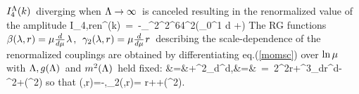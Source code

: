 \s$I_4^\Lambda(k)\hspace{0.05cm}$ diverging when \s$\Lambda\to\infty\hspace{0.05cm}$
is canceled resulting in the renormalized
value of the amplitude
\qq
\hat I_{4,ren}^\La(k)\ =\
-{_{\mu^2\m\la^2}\over^{64\pi^2}}\left(\int_0^1 d\alpha
\s\s{}
\s+\right)
\non
\qqq
The RG functions \s$\beta(\lambda,r)=\mu{d\over d\mu}\hspace{0.025cm}\lambda\hspace{0.05cm},
\ \hspace{0.05cm}\gamma_2(\lambda,r)=\mu{d\over d\mu}\hspace{0.025cm} r\hspace{0.05cm}$ describing the
scale-dependence of the renormalized couplings are obtained
by differentiating eq.\s\s(\ref{momsc}) over \s$\ln{\mu}\hspace{0.05cm}$
with \s$\Lambda,g(\Lambda)\hspace{0.05cm}$ and \s$m^2(\Lambda)\hspace{0.05cm}$ held fixed:
&=&\mu\m\la\s+\s\mu^2{_{d\m\la}\over^{d\mu}}\s,&=&\s[\m\mu^2 r\s+\s\hh\m{_{g^2}\over^{16\pi^2}}
\s\ln{_\La\over^\mu}\s\m+\s\s\CO({\hh}^2)\m]\ =\
2\m\mu^2\m r\s+\s\mu^3{_{d\m r}\over^{d\mu}}\s-\s\hh
\s\mu^2\m{_{\la^2}\over^{16\pi^2}}\s\m+\s\s\CO({\hh}^2)
\non
\qqq
so that
\qq
\beta(\la,r)\s=\s-\la\s,\quad\quad\gamma_2(\la,r)\s= r\s+\s\hh{}\s\m+\s\s\CO({\hh}^2)\s.
\label{RGmom}
\qqq
\vskip 0.4cm


